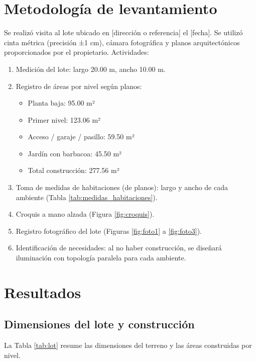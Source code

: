 \section{Metodología de levantamiento}
Se realizó visita al lote ubicado en [dirección o referencia] el [fecha]. Se utilizó cinta métrica (precisión ±1 cm), cámara fotográfica y planos arquitectónicos proporcionados por el propietario. Actividades:
\begin{enumerate}
    \item Medición del lote: largo 20.00 m, ancho 10.00 m.
    \item Registro de áreas por nivel según planos:
        \begin{itemize}
            \item Planta baja: 95.00 m²
            \item Primer nivel: 123.06 m²
            \item Acceso / garaje / pasillo: 59.50 m²
            \item Jardín con barbacoa: 45.50 m²
            \item Total construcción: 277.56 m²
        \end{itemize}
    \item Toma de medidas de habitaciones (de planos): largo y ancho de cada ambiente (Tabla \ref{tab:medidas_habitaciones}).
    \item Croquis a mano alzada (Figura \ref{fig:croquis}).
    \item Registro fotográfico del lote (Figuras \ref{fig:foto1} a \ref{fig:foto3}).
    \item Identificación de necesidades: al no haber construcción, se diseñará iluminación con topología paralela para cada ambiente.
\end{enumerate}

\section{Resultados}

\subsection{Dimensiones del lote y construcción}
La Tabla \ref{tab:lot} resume las dimensiones del terreno y las áreas construidas por nivel.


